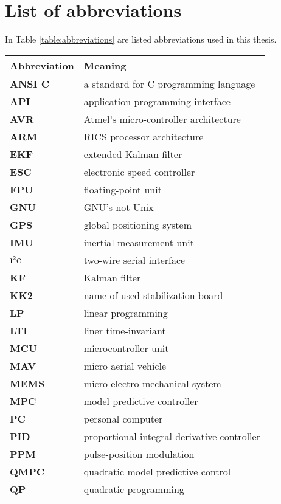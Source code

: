 \section{List of abbreviations}\label{ape:abbreviations}

In Table \ref{table:abbreviations} are listed abbreviations used in this thesis.

\begin{table}[!htb]
\centering
\begin{tabular}{ll}
\hline
\textbf{Abbreviation} & \textbf{Meaning} \\
\hline
\textbf{ANSI C} & a standard for C programming language \\
\textbf{API} & application programming interface \\
\textbf{AVR} & Atmel's micro-controller architecture \\
\textbf{ARM} & RICS processor architecture \\
\textbf{EKF} & extended Kalman filter \\ 
\textbf{ESC} & electronic speed controller \\
\textbf{FPU} & floating-point unit \\
\textbf{GNU} & GNU's not Unix \\
\textbf{GPS} & global positioning system \\
\textbf{IMU} & inertial measurement unit \\
\textbf{$\textsc{i}^2\textsc{c}$} & two-wire serial interface\\
\textbf{KF} & Kalman filter \\
\textbf{KK2} & name of used stabilization board\\
\textbf{LP} & linear programming \\
\textbf{LTI} & liner time-invariant \\
\textbf{MCU} & microcontroller unit \\
\textbf{MAV} & micro aerial vehicle \\
\textbf{MEMS} & micro-electro-mechanical system \\
\textbf{MPC} & model predictive controller \\
\textbf{PC} & personal computer \\
\textbf{PID} & proportional-integral-derivative controller \\
\textbf{PPM} & pulse-position modulation \\
\textbf{QMPC} & quadratic model predictive control\\
\textbf{QP} & quadratic programming \\

\end{tabular}
\end{table}
